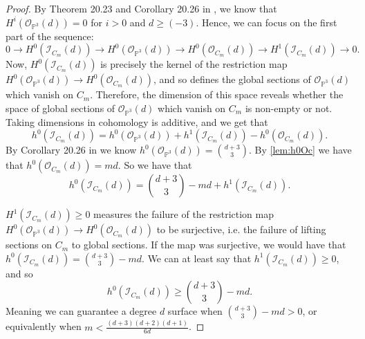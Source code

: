 \begin{proof}
    By Theorem 20.23 and Corollary 20.26 in \cite{EO25}, we know that $H^i(\mathcal{O}_{\mathbb{P}^3}(d)) = 0$ for $i > 0$ and $d \geq (-3)$. Hence, we can focus on the first part of the sequence:
    \[0 \to H^0(\mathcal{I}_{C_m}(d)) \to H^0(\mathcal{O}_{\mathbb{P}^3}(d)) \to H^0(\mathcal{O}_{C_m}(d)) \to H^1(\mathcal{I}_{C_m}(d)) \to 0.\] 
    Now, $H^0(\mathcal{I}_{C_m}(d))$ is precisely the kernel of the restriction map $H^0(\mathcal{O}_{\mathbb{P}^3}(d)) \to H^0(\mathcal{O}_{C_m}(d))$, and so defines the global sections of $\mathcal{O}_{\mathbb{P}^3}(d)$ which vanish on $C_m$. Therefore, the dimension of this space reveals whether the space of global sections of $\mathcal{O}_{\mathbb{P}^3}(d)$ which vanish on $C_m$ is non-empty or not. Taking dimensions in cohomology is additive, and we get that
    \[h^0(\mathcal{I}_{C_m}(d)) = h^0(\mathcal{O}_{\mathbb{P}^3}(d)) + h^1(\mathcal{I}_{C_m}(d)) - h^0(\mathcal{O}_{C_m}(d)).\]
    By Corollary 20.26 in \cite{EO25} we know $h^0(\mathcal{O}_{\mathbb{P}^3}(d)) = \binom{d+3}{3}$. By \cref{lem:h0Oc} we have that $h^0(\mathcal{O}_{C_m}(d)) = md$. So we have that
    \[h^0(\mathcal{I}_{C_m}(d)) = \binom{d+3}{3} - md + h^1(\mathcal{I}_{C_m}(d)).\]
    


    $H^1(\mathcal{I}_{C_m}(d)) \geq 0$ measures the failure of the restriction map $H^0(\mathcal{O}_{\mathbb{P}^3}(d)) \to H^0(\mathcal{O}_{C_m}(d))$ to be surjective, i.e. the failure of lifting sections on $C_m$ to global sections. If the map was surjective, we would have that $h^0(\mathcal{I}_{C_m}(d)) = \binom{d+3}{3} - md$. We can at least say that $h^1(\mathcal{I}_{C_m}(d)) \geq 0$, and so
    \[h^0(\mathcal{I}_{C_m}(d)) \geq \binom{d+3}{3} - md.\]
    Meaning we can guarantee a degree $d$ surface when $\binom{d+3}{3} - md > 0$, or equivalently when $m < \frac{(d+3)(d+2)(d+1)}{6d}$.
\end{proof}

